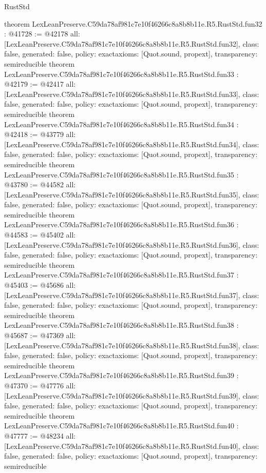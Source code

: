 \begin{lexlean}{RustStd}
\begin{coremodule}
{}
theorem LexLeanPreserve.C59da78af981c7e10f46266c8a8b8b11e.R5.RustStd.fun32 : @41728 := @42178 {
  all: [LexLeanPreserve.C59da78af981c7e10f46266c8a8b8b11e.R5.RustStd.fun32],
  class: false,
  generated: false,
  policy: exact{axioms: [Quot.sound, propext]},
  transparency: semireducible
}
theorem LexLeanPreserve.C59da78af981c7e10f46266c8a8b8b11e.R5.RustStd.fun33 : @42179 := @42417 {
  all: [LexLeanPreserve.C59da78af981c7e10f46266c8a8b8b11e.R5.RustStd.fun33],
  class: false,
  generated: false,
  policy: exact{axioms: [Quot.sound, propext]},
  transparency: semireducible
}
theorem LexLeanPreserve.C59da78af981c7e10f46266c8a8b8b11e.R5.RustStd.fun34 : @42418 := @43779 {
  all: [LexLeanPreserve.C59da78af981c7e10f46266c8a8b8b11e.R5.RustStd.fun34],
  class: false,
  generated: false,
  policy: exact{axioms: [Quot.sound, propext]},
  transparency: semireducible
}
theorem LexLeanPreserve.C59da78af981c7e10f46266c8a8b8b11e.R5.RustStd.fun35 : @43780 := @44582 {
  all: [LexLeanPreserve.C59da78af981c7e10f46266c8a8b8b11e.R5.RustStd.fun35],
  class: false,
  generated: false,
  policy: exact{axioms: [Quot.sound, propext]},
  transparency: semireducible
}
theorem LexLeanPreserve.C59da78af981c7e10f46266c8a8b8b11e.R5.RustStd.fun36 : @44583 := @45402 {
  all: [LexLeanPreserve.C59da78af981c7e10f46266c8a8b8b11e.R5.RustStd.fun36],
  class: false,
  generated: false,
  policy: exact{axioms: [Quot.sound, propext]},
  transparency: semireducible
}
theorem LexLeanPreserve.C59da78af981c7e10f46266c8a8b8b11e.R5.RustStd.fun37 : @45403 := @45686 {
  all: [LexLeanPreserve.C59da78af981c7e10f46266c8a8b8b11e.R5.RustStd.fun37],
  class: false,
  generated: false,
  policy: exact{axioms: [Quot.sound, propext]},
  transparency: semireducible
}
theorem LexLeanPreserve.C59da78af981c7e10f46266c8a8b8b11e.R5.RustStd.fun38 : @45687 := @47369 {
  all: [LexLeanPreserve.C59da78af981c7e10f46266c8a8b8b11e.R5.RustStd.fun38],
  class: false,
  generated: false,
  policy: exact{axioms: [Quot.sound, propext]},
  transparency: semireducible
}
theorem LexLeanPreserve.C59da78af981c7e10f46266c8a8b8b11e.R5.RustStd.fun39 : @47370 := @47776 {
  all: [LexLeanPreserve.C59da78af981c7e10f46266c8a8b8b11e.R5.RustStd.fun39],
  class: false,
  generated: false,
  policy: exact{axioms: [Quot.sound, propext]},
  transparency: semireducible
}
theorem LexLeanPreserve.C59da78af981c7e10f46266c8a8b8b11e.R5.RustStd.fun40 : @47777 := @48234 {
  all: [LexLeanPreserve.C59da78af981c7e10f46266c8a8b8b11e.R5.RustStd.fun40],
  class: false,
  generated: false,
  policy: exact{axioms: [Quot.sound, propext]},
  transparency: semireducible
}
\end{coremodule}
\end{lexlean}
